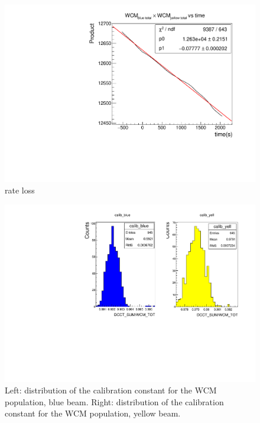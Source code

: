 \begin{figure}
  \centering
  \includegraphics[width=\linewidth]{./figures/wcm_rate_loss.pdf}
  \caption{
    rate loss
  }
  \label{fig:wcm_rate_loss}
\end{figure}

\begin{figure}
  \centering
  \includegraphics[width=\linewidth]{./figures/wcm_calibration_example.pdf}
  \caption{
    Left: distribution of the calibration constant for the WCM population, blue
    beam. Right: distribution of the calibration constant for the WCM
    population, yellow beam.
  }
  \label{fig:wcm_calibration}
\end{figure}

